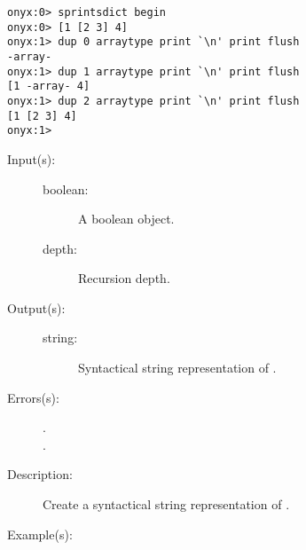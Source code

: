 \begin{description}
\begin{description}
\begin{verbatim}
onyx:0> sprintsdict begin
onyx:0> [1 [2 3] 4]
onyx:1> dup 0 arraytype print `\n' print flush
-array-
onyx:1> dup 1 arraytype print `\n' print flush
[1 -array- 4]
onyx:1> dup 2 arraytype print `\n' print flush
[1 [2 3] 4]
onyx:1>
		\end{verbatim}
	\end{description}
\label{sprintsdict:booleantype}
\item[{\onyxop{boolean depth}{booleantype}{string}}: ]
	\begin{description}\item[]
	\item[Input(s): ]
		\begin{description}\item[]
		\item[boolean: ]
			A boolean object.
		\item[depth: ]
			Recursion depth.
		\end{description}
	\item[Output(s): ]
		\begin{description}\item[]
		\item[string: ]
			Syntactical string representation of .
		\end{description}
	\item[Errors(s): ]
		\begin{description}\item[]
		\item[.]
		\item[.]
		\end{description}
	\item[Description: ]
		Create a syntactical string representation of .
	\item[Example(s): ]\begin{verbatim}


\end{verbatim}
\end{description}
\end{description}
